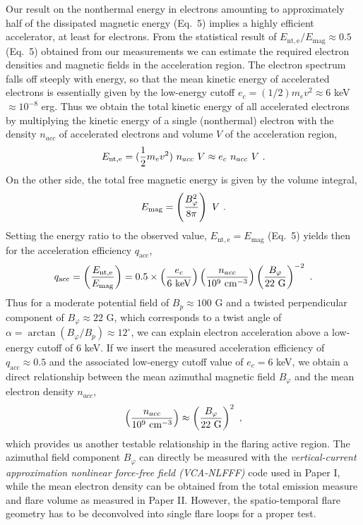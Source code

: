 \documentclass[10pt,preprint]{aastex}  %
\begin{document}
Our result on the nonthermal energy in electrons amounting
to approximately half of the dissipated magnetic energy (Eq.~5)
implies a highly efficient accelerator, at least for electrons.
From the statistical result of
 $E_{\mathrm{nt,e}}/E_{\mathrm{mag}} \approx 0.5$ (Eq.~5) obtained
from our measurements we can estimate the required electron
densities and magnetic fields in the acceleration region.
The electron spectrum falls off steeply with energy, so that
the mean kinetic energy of accelerated electrons is essentially
given by the low-energy cutoff $e_c = (1/2) m_e v^2 \approx
6$ keV $\approx 10^{-8}$ erg. Thus we obtain the total kinetic 
energy of all accelerated electrons by multiplying the kinetic energy
of a single (nonthermal) electron with the density $n_{acc}$
of accelerated electrons and volume $V$ of the acceleration region,
\begin{equation}
	E_{\mathrm{nt,e}} = ({1 \over 2} m_e v^2) \ n_{acc} \ V 
	         \approx e_c \ n_{acc} \ V \ .
\end{equation}
On the other side, the total free magnetic energy is given by the
volume integral,
\begin{equation}
	E_{\mathrm{mag}} = \left( {B_\varphi^2 \over 8 \pi } \right) \ V \ .
\end{equation}
Setting the energy ratio to the observed value,  
$E_{\mathrm{nt,e}} = E_{\mathrm{mag}}$ (Eq.~5) yields then
for the acceleration efficiency $q_{\mathrm{acc}}$,
\begin{equation}
	q_{\mathrm{acc}} = 
	\left( {E_{\mathrm{nt,e}} \over E_{\mathrm{mag}}} \right) = 0.5 \times 
	\left( {e_c      \over 6\ {\rm keV}} \right) 
	\left( {n_{acc}  \over 10^9\ {\rm cm}^{-3} } \right) 
	\left( {B_{\varphi} \over 22\ {\rm G}} \right)^{-2} \ .
\end{equation}
Thus for a moderate potential field of $B_p \approx 100$ G and
a twisted perpendicular component of $B_\varphi \approx 22$ G,
which corresponds to a twist angle of 
$\alpha = \arctan{(B_{\varphi} / B_{p})} \approx 12^\circ$,
we can explain electron acceleration above a low-energy cutoff
of 6 keV. If we insert the measured acceleration efficiency of
$q_{\mathrm{acc}} \approx 0.5$ and the associated low-energy cutoff 
value of $e_c = 6$ keV, we obtain a direct relationship between
the mean azimuthal magnetic field $B_{\varphi}$ and the mean electron
density $n_{acc}$,
\begin{equation}
	\left( {n_{acc}      \over 10^9\ {\rm cm}^{-3} } \right) 
	\approx \left( {B_{\varphi} \over 22\ {\rm G}} \right)^{2} \ ,
\end{equation}
which provides us another testable relationship in the flaring
active region. The azimuthal field component $B_{\varphi}$ can directly 
be measured with the {\sl vertical-current approximation nonlinear 
force-free field (VCA-NLFFF)} code used in Paper I, while the
mean electron density can be obtained from the total emission
measure and flare volume as measured in Paper II. However,
the spatio-temporal flare geometry has to be deconvolved into 
single flare loops for a proper test.
\end{document}
